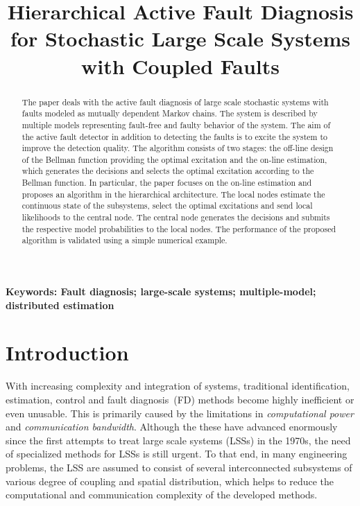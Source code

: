 \documentclass[conference,10pt]{IEEEtran}
\begin{document}
\title{Hierarchical Active Fault Diagnosis for Stochastic Large Scale Systems with Coupled Faults} 

\author{
}

\maketitle

\begin{abstract}
  The paper deals with the active fault diagnosis of large scale stochastic systems with faults modeled as mutually dependent Markov chains.
  The system is described by multiple models representing fault-free and faulty behavior of the system.
  The aim of the active fault detector in addition to detecting the faults is to excite the system to improve the detection quality.
  The algorithm consists of two stages: the off-line design of the Bellman function providing the optimal excitation and the on-line estimation, which generates the decisions and selects the optimal excitation according to the Bellman function.
  In particular, the paper focuses on the on-line estimation and proposes an algorithm in the hierarchical architecture.
  The local nodes estimate the continuous state of the subsystems, select the optimal excitations and send local likelihoods to the central node.
  The central node generates the decisions and submits the respective model probabilities to the local nodes.
  The performance of the proposed algorithm is validated using a simple numerical example.
\end{abstract}
\noindent
{\bf Keywords: Fault diagnosis; large-scale systems; multiple-model; distributed estimation}
\section{Introduction}\label{sec:introduction}
With increasing complexity and integration of systems, traditional identification, estimation, control and fault diagnosis~(FD) methods become highly inefficient or even unusable.
This is primarily caused by the limitations in \emph{computational power} and \emph{communication bandwidth}.
Although the these have advanced enormously since the first attempts to treat large scale systems (LSSs) in the 1970s, the need of specialized methods for LSSs is still urgent.
To that end, in many engineering problems, the LSS are assumed to consist of several interconnected subsystems of various degree of coupling and spatial distribution, which helps to reduce the computational and communication complexity of the developed methods. 
\end{document}
